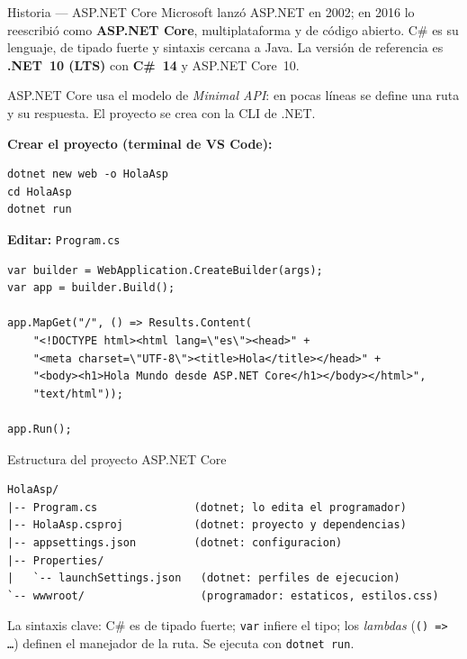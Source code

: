 \begin{cajahistoria}{Historia --- ASP.NET Core}
Microsoft lanzó ASP.NET en 2002; en 2016 lo reescribió como
\textbf{ASP.NET Core}, multiplataforma y de código abierto. C\# es su
lenguaje, de tipado fuerte y sintaxis cercana a Java. La versión de
referencia es \textbf{.NET~10 (LTS)} con \textbf{C\#~14} y ASP.NET
Core~10.
\end{cajahistoria}

ASP.NET Core usa el modelo de \emph{Minimal API}: en pocas líneas se
define una ruta y su respuesta. El proyecto se crea con la CLI de .NET.

{\small\textbf{Crear el proyecto (terminal de VS Code):}}
\begin{lstlisting}[style=shell,caption={Creacion del proyecto ASP.NET Core},label={lst:c5-asp-new}]
dotnet new web -o HolaAsp
cd HolaAsp
dotnet run
\end{lstlisting}

{\small\textbf{Editar:} \texttt{Program.cs}}
\begin{lstlisting}[style=cs,caption={Program.cs --- Hola Mundo en ASP.NET Core},label={lst:c5-asp-hola}]
var builder = WebApplication.CreateBuilder(args);
var app = builder.Build();

app.MapGet("/", () => Results.Content(
    "<!DOCTYPE html><html lang=\"es\"><head>" +
    "<meta charset=\"UTF-8\"><title>Hola</title></head>" +
    "<body><h1>Hola Mundo desde ASP.NET Core</h1></body></html>",
    "text/html"));

app.Run();
\end{lstlisting}

\begin{cajaejemplo}{Estructura del proyecto ASP.NET Core}
\begin{lstlisting}[style=shell,caption={Estructura creada por dotnet new web},label={lst:c5-asp-tree}]
HolaAsp/
|-- Program.cs               (dotnet; lo edita el programador)
|-- HolaAsp.csproj           (dotnet: proyecto y dependencias)
|-- appsettings.json         (dotnet: configuracion)
|-- Properties/
|   `-- launchSettings.json   (dotnet: perfiles de ejecucion)
`-- wwwroot/                  (programador: estaticos, estilos.css)
\end{lstlisting}
\end{cajaejemplo}

La sintaxis clave: C\# es de tipado fuerte; \texttt{var} infiere el tipo;
los \emph{lambdas} (\texttt{() => \ldots}) definen el manejador de la
ruta. Se ejecuta con \texttt{dotnet run}.

